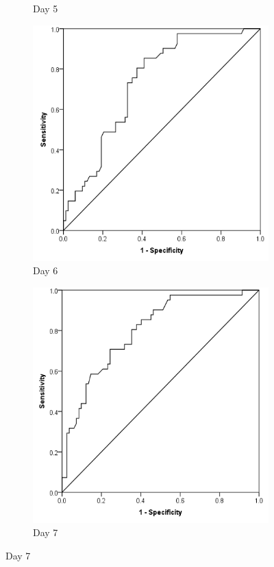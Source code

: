 \begin{figure}[t]
\begin{subfigure}{0.3\textwidth}
		\caption{Day 5}
		\label{fig:crp_comp_ROC_infection_D5}
	\end{subfigure}
	\begin{subfigure}{0.3\textwidth}
		\centering
		\includegraphics[width=\textwidth]{Figures/crp_comp_ROC_infection_D6}
		\caption{Day 6}		
		\label{fig:crp_comp_ROC_infection_D6}
	\end{subfigure}
	\begin{subfigure}{0.3\textwidth}
		\centering
		\includegraphics[width=\textwidth]{Figures/crp_comp_ROC_infection_D7}
		\caption{Day 7}
		\label{fig:crp_comp_ROC_infection_D7}
	\end{subfigure}
\end{figure}
\vfill


